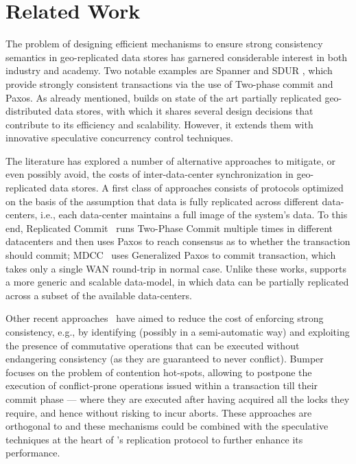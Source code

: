 \section{Related Work}
The problem of designing efficient mechanisms to ensure strong consistency semantics in geo-replicated data stores has garnered considerable interest in both industry and academy. Two notable examples are Spanner \cite{spanner} and SDUR \cite{scatter}, which  provide strongly consistent transactions via the use of Two-phase commit and Paxos. As already mentioned, \specula builds on state of the art partially replicated geo-distributed data stores, with which it shares several design decisions that contribute to its efficiency and scalability. However, it extends them with innovative speculative concurrency control techniques.

The literature has explored a number of alternative approaches to mitigate, or even possibly avoid, the costs of inter-data-center synchronization in geo-replicated data stores. A first class of approaches consists of protocols  optimized on the basis of the assumption that data is fully replicated across different data-centers, i.e., each data-center maintains a full image of the system's data. To this end, Replicated Commit~\cite{mahmoud2013low} runs Two-Phase Commit multiple times
in different datacenters and then uses Paxos to reach consensus as to whether the transaction should commit; MDCC~\cite{kraska2013mdcc} uses Generalized Paxos \cite{lamport2005generalized} to commit transaction, which takes only a single WAN round-trip in normal case. Unlike these works, \specula supports a more generic and scalable data-model, in which data can be partially replicated across a subset of the available data-centers.

 
 Other recent approaches~\cite{zhang2013transaction,SwiftCloud,Walter} have aimed to reduce the cost of enforcing strong consistency, e.g., by identifying (possibly in a semi-automatic way) and exploiting the presence of commutative operations that can be executed without endangering consistency (as they are guaranteed  to never conflict). Bumper~\cite{Diegues2013SRDS}  focuses on the problem of contention hot-spots, allowing to postpone the execution of conflict-prone operations issued within a transaction till their commit phase --- where they are executed after having acquired all the locks they require, and hence without risking to incur aborts. These approaches are orthogonal to \specula and  these mechanisms  could be combined with the speculative techniques  at the heart of \specula's replication protocol to further enhance its performance.
 

